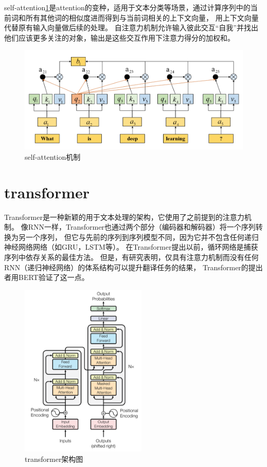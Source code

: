 self-attention\ref{fig:attent}是attention的变种，适用于文本分类等场景，通过计算序列中的当前词和所有其他词的相似度进而得到与当前词相关的上下文向量，
用上下文向量代替原有输入向量做后续的处理。
自注意力机制允许输入彼此交互“自我”并找出他们应该更多关注的对象，输出是这些交互作用下注意力得分的加权和。
\begin{figure}[htbp]
  \centering
  \includegraphics[width=13cm]{./images/attention.png}
  \caption{self-attention机制}
  \label{fig:attent}
\end{figure}

\section{transformer}
Transformer\cite{vaswani2017attention}是一种新颖的用于文本处理的架构，它使用了之前提到的注意力机制。
像RNN一样，Transformer也通过两个部分（编码器和解码器）将一个序列转换为另一个序列，
但它与先前的序列到序列模型不同，因为它并不包含任何递归神经网络网络（如GRU，LSTM等）。
在Transformer提出以前，循环网络是捕获序列中依存关系的最佳方法。 
但是，有研究表明，仅具有注意力机制而没有任何RNN（递归神经网络）的体系结构可以提升翻译任务的结果，
Transformer的提出者用BERT验证了这一点。

\begin{figure}[htbp]
  \centering
  \includegraphics[width=6cm]{./images/transformer.png}
  \caption{transformer架构图\cite{vaswani2017attention}}
  \label{fig:transformer}
\end{figure}

